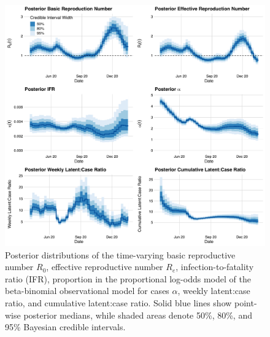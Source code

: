\begin{figure}[htbp]
    \centering
    \includegraphics[width=1.0\columnwidth]{main_posterior_results_plot.pdf}
    \caption[Posterior results for time-varying parameters.]{Posterior distributions of the time-varying basic reproductive number $R_0$, effective reproductive number $R_e$, infection-to-fatality ratio (IFR), proportion in the proportional log-odds model of the beta-binomial observational model for cases $\alpha$, weekly latent:case ratio, and cumulative latent:case ratio.
    Solid blue lines show point-wise posterior medians, while shaded areas denote 50\%, 80\%, and 95\% Bayesian credible intervals.}
    \label{ch_4:fig:main_posterior_results_plot}
\end{figure}

